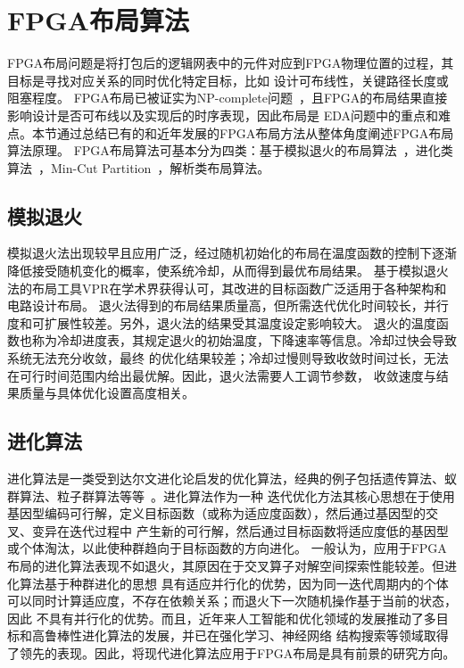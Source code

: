 \vspace{-0.2in}

\section{FPGA布局算法}

FPGA布局问题是将打包后的逻辑网表中的元件对应到FPGA物理位置的过程，其目标是寻找对应关系的同时优化特定目标，比如
设计可布线性，关键路径长度或阻塞程度。
FPGA布局已被证实为NP-complete问题~\cite{panchal2015solving}，且FPGA的布局结果直接影响设计是否可布线以及实现后的时序表现，因此布局是
EDA问题中的重点和难点。本节通过总结已有的和近年发展的FPGA布局方法从整体角度阐述FPGA布局算法原理。
FPGA布局算法可基本分为四类：基于模拟退火的布局算法~\cite{eguro_retime-place_fccm2008,kirkpatrick1983optimization}，进化类算法~\cite{yang2005fpga,venkatraman2000evolutionary,jamieson2013supergenes,wang2009ant}，Min-Cut Partition~\cite{maidee2005timing}，解析类布局算法\cite{gort_analytical-placement_fpl2012,abuowaimer2018gplace3}。

\subsection{模拟退火}
模拟退火法出现较早且应用广泛，经过随机初始化的布局在温度函数的控制下逐渐降低接受随机变化的概率，使系统冷却，从而得到最优布局结果。
基于模拟退火法的布局工具VPR在学术界获得认可，其改进的目标函数广泛适用于各种架构和电路设计布局。
退火法得到的布局结果质量高，但所需迭代优化时间较长，并行度和可扩展性较差。另外，退火法的结果受其温度设定影响较大。
退火的温度函数也称为冷却进度表，其规定退火的初始温度，下降速率等信息。冷却过快会导致系统无法充分收敛，最终
的优化结果较差；冷却过慢则导致收敛时间过长，无法在可行时间范围内给出最优解。因此，退火法需要人工调节参数，
收敛速度与结果质量与具体优化设置高度相关。


\subsection{进化算法}
进化算法是一类受到达尔文进化论启发的优化算法，经典的例子包括遗传算法、蚁群算法、粒子群算法等等~\cite{DBLP:journals/corr/abs-1906-08870}。进化算法作为一种
迭代优化方法其核心思想在于使用基因型编码可行解，定义目标函数（或称为适应度函数），然后通过基因型的交叉、变异在迭代过程中
产生新的可行解，然后通过目标函数将适应度低的基因型或个体淘汰，以此使种群趋向于目标函数的方向进化。
一般认为，应用于FPGA布局的进化算法表现不如退火，其原因在于交叉算子对解空间探索性能较差。但进化算法基于种群进化的思想
具有适应并行化的优势，因为同一迭代周期内的个体可以同时计算适应度，不存在依赖关系；而退火下一次随机操作基于当前的状态，因此
不具有并行化的优势。而且，近年来人工智能和优化领域的发展推动了多目标和高鲁棒性进化算法的发展，并已在强化学习、神经网络
结构搜索等领域取得了领先的表现。因此，将现代进化算法应用于FPGA布局是具有前景的研究方向。

